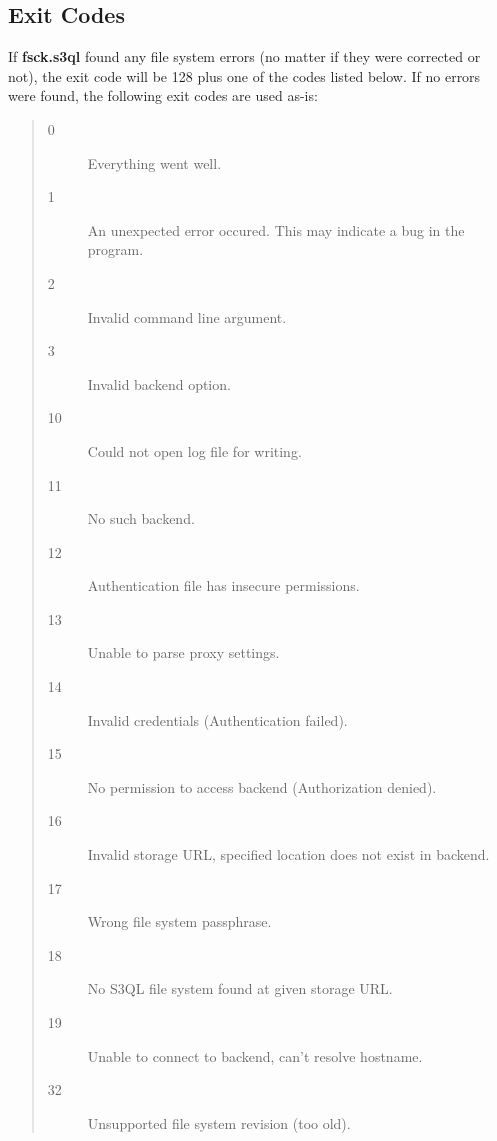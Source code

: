 \documentclass[letterpaper,10pt,english]{sphinxmanual}
\begin{document}
\subsection{Exit Codes}
\label{man/fsck:exit-codes}
If \textbf{fsck.s3ql} found any file system errors (no matter if they were
corrected or not), the exit code will be 128 plus one of the codes
listed below. If no errors were found, the following exit codes are
used as-is:
\begin{quote}\begin{description}
\item[{0}] \leavevmode
Everything went well.

\item[{1}] \leavevmode
An unexpected error occured. This may indicate a bug in the
program.

\item[{2}] \leavevmode
Invalid command line argument.

\item[{3}] \leavevmode
Invalid backend option.

\item[{10}] \leavevmode
Could not open log file for writing.

\item[{11}] \leavevmode
No such backend.

\item[{12}] \leavevmode
Authentication file has insecure permissions.

\item[{13}] \leavevmode
Unable to parse proxy settings.

\item[{14}] \leavevmode
Invalid credentials (Authentication failed).

\item[{15}] \leavevmode
No permission to access backend (Authorization denied).

\item[{16}] \leavevmode
Invalid storage URL, specified location does not exist in backend.

\item[{17}] \leavevmode
Wrong file system passphrase.

\item[{18}] \leavevmode
No S3QL file system found at given storage URL.

\item[{19}] \leavevmode
Unable to connect to backend, can't resolve hostname.

\item[{32}] \leavevmode
Unsupported file system revision (too old).


\end{description}
\end{quote}
\end{document}
